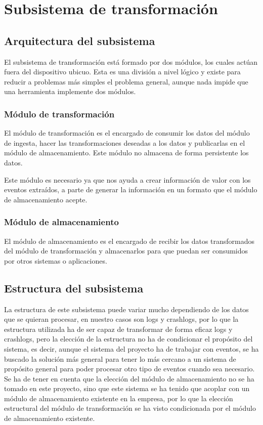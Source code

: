 \chapter{Subsistema de transformación}

\section{Arquitectura del subsistema}

El subsistema de transformación está formado por dos módulos, los cuales actúan fuera del dispositivo ubicuo. Esta es una división a nivel lógico y existe para reducir a problemas más simples el problema general, aunque nada impide que una herramienta implemente dos módulos.

\subsection{Módulo de transformación}

El módulo de transformación es el encargado de consumir los datos del módulo de ingesta, hacer las transformaciones deseadas a los datos y publicarlas en el módulo de almacenamiento. Este módulo no almacena de forma persistente los datos.

Este módulo es necesario ya que nos ayuda a crear información de valor con los eventos extraídos, a parte de generar la información en un formato que el módulo de almacenamiento acepte.

\subsection{Módulo de almacenamiento}

El módulo de almacenamiento es el encargado de recibir los datos transformados del módulo de transformación y almacenarlos para que puedan ser consumidos por otros sistemas o aplicaciones.



\section{Estructura del subsistema}

La estructura de este subsistema puede variar mucho dependiendo de los datos que se quieran procesar, en nuestro casos son logs y crashlogs, por lo que la estructura utilizada ha de ser capaz de transformar de forma eficaz logs y crashlogs, pero la elección de la estructura no ha de condicionar el propósito del sistema, es decir, aunque el sistema del proyecto ha de trabajar con eventos, se ha buscado la solución más general para tener lo más cercano a un sistema de propósito general para poder procesar otro tipo de eventos cuando sea necesario. Se ha de tener en cuenta que la elección del módulo de almacenamiento no se ha tomado en este proyecto, sino que este sistema se ha tenido que acoplar con un módulo de almacenamiento existente en la empresa, por lo que la elección estructural del módulo de transformación se ha visto condicionada por el módulo de almacenamiento existente.



